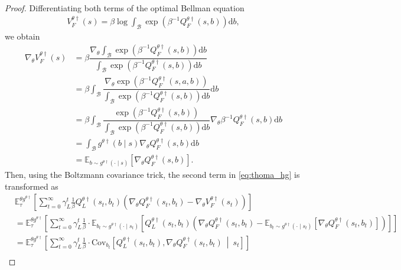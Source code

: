 \documentclass[letterpaper]{article} %
\providecommand{\E}{\mathbb{E}} %
\providecommand{\rmd}{\mathrm{d}} %
\begin{document}
\begin{proof}
Differentiating both terms of the optimal Bellman equation
\begin{align}
    V_F^{\theta\dag}(s)=\beta\log\int_{\mathcal{B}}\exp\left(\beta^{-1}Q_F^{\theta\dag}(s,b)\right)\rmd b,
\end{align}
we obtain
\begin{subequations}
\begin{align}
    \nabla_{\theta}V_F^{\theta\dagger}(s)&=\beta\dfrac{\nabla_{\theta}\int_{\mathcal{B}}\exp\left(\beta^{-1}Q_F^{\theta\dagger}(s,b)\right)\rmd b}{\int_{\mathcal{B}}\exp\left(\beta^{-1}Q_F^{\theta\dagger}(s,b)\right)\rmd b}\\
    &=\beta\int_{\mathcal{B}}\dfrac{\nabla_{\theta}\exp\left(\beta^{-1}Q_F^{\theta\dagger}(s,a,b)\right)}{\int_{\mathcal{B}}\exp\left(\beta^{-1}Q_F^{\theta\dagger}(s,b)\right)\rmd b}\rmd b\\
    &=\beta\int_{\mathcal{B}}\dfrac{\exp\left(\beta^{-1}Q_F^{\theta\dagger}(s,b)\right)}{\int_{\mathcal{B}}\exp\left(\beta^{-1}Q_F^{\theta\dagger}(s,b)\right)\rmd b}\nabla_{\theta}\beta^{-1}Q_F^{\theta\dagger}(s,b)\rmd b\\
    &=\int_{\mathcal{B}}g^{\theta \dagger}(b\mid s)\nabla_{\theta}Q_F^{\theta\dagger}(s,b)\rmd b\\
    &=\E_{b\sim g^{\theta \dagger}(\cdot\mid s)}\left[\nabla_{\theta}Q_F^{\theta\dagger}(s,b)\right].
\end{align}
\end{subequations}
Then, using the Boltzmann covariance trick, the second term in \eqref{eq:thoma_hg} is transformed as
\begin{subequations}
\begin{align}
    &\E_\tau^{\theta g^{\theta\dagger}}\left[\sum_{t=0}^\infty \gamma_L^t \frac{1}{\beta} Q_L^{{\theta}\dagger}(s_t, b_t) \left(\nabla_{\theta}Q_F^{{\theta} \dagger}(s_t, b_t) - \nabla_{\theta}V_F^{{\theta} \dagger}(s_t)\right) \right]\nonumber\\
    &=\E_\tau^{\theta g^{\theta\dagger}}\left[\sum_{t=0}^\infty \gamma_L^t \frac{1}{\beta} 
    \cdot\E_{b_t\sim g^{\theta\dagger}(\cdot\mid s_t)}\left[Q_L^{{\theta}\dagger}(s_t, b_t) \left(\nabla_{\theta}Q_F^{{\theta} \dagger}(s_t, b_t) - \E_{b_t\sim g^{\theta\dagger}(\cdot\mid s_t)}\left[\nabla_{\theta}Q_F^{{\theta} \dagger}(s_t,b_t)\right]\right)\right] \right]\\
    &=\E_\tau^{\theta g^{\theta\dagger}}\left[\sum_{t=0}^\infty \gamma_L^t \frac{1}{\beta} 
    \cdot\mathrm{Cov}_{b_t}\left[Q_L^{{\theta}\dagger}(s_t, b_t), \nabla_{\theta}Q_F^{{\theta} \dagger}(s_t, b_t)~\middle|~ s_t\right] \right]\\

\end{align}
\end{subequations}
\end{proof}
\end{document}
